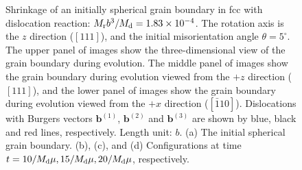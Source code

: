 \begin{figure}[htbp]
	\centering
	\centering
	\caption{Shrinkage of an initially spherical grain boundary in fcc with dislocation reaction: $M_{\rm r}b^3/M_{\rm d}=1.83\times10^{-4}$. The rotation axis is the $z$ direction ($[111]$), and the initial misorientation angle $\theta=5^\circ$. The upper panel of images show the three-dimensional view of the grain boundary during evolution. The middle panel of images show the grain boundary during evolution viewed from the $+z$ direction ($[111]$), and the lower panel of images show the grain boundary during evolution viewed from the $+x$ direction ($[\bar{1}10]$). Dislocations with Burgers vectors $\mathbf b^{(1)}$, $\mathbf b^{(2)}$ and $\mathbf b^{(3)}$ are shown by blue, black and red lines, respectively. Length unit: $b$. (a) The initial spherical grain boundary. (b), (c), and (d) Configurations at time $t=10/M_{\rm d}\mu, 15/M_{\rm d}\mu, 20/M_{\rm d}\mu$, respectively.}\label{fig:fccfigure}
\end{figure}



